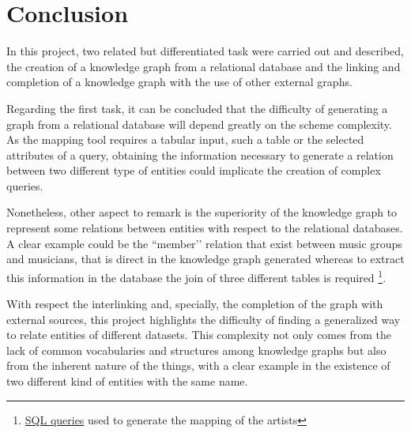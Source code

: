 \section{Conclusion}
In this project, two related but differentiated task were carried out and described, the creation of a knowledge graph from a relational database and the linking and completion of a knowledge graph with the use of other external graphs. 

Regarding the first task, it can be concluded that the difficulty of generating a graph from a relational database will depend greatly on the scheme complexity. 
As the mapping tool requires a tabular input, such a table or the selected attributes of a query, obtaining the information necessary to generate a relation between two different type of entities could implicate the creation of complex queries.  

Nonetheless, other aspect to remark is the superiority of the knowledge graph to represent some relations between entities with respect to the relational databases.
A clear example could be the ``member’’ relation that exist between music groups and musicians, that is direct in the knowledge graph generated whereas to extract this information in the database the join of three different tables is required \footnote{\href{https://github.com/adrigrillo/music_kg/blob/master/queries/sql/query-artist.sql}{SQL queries} used to generate the mapping of the artists}.  

With respect the interlinking and, specially, the completion of the graph with external sources, this project highlights the difficulty of finding a generalized way to relate entities of different datasets. 
This complexity not only comes from the lack of common vocabularies and structures among knowledge graphs but also from the inherent nature of the things, with a clear example in the existence of two different kind of entities with the same name. 
